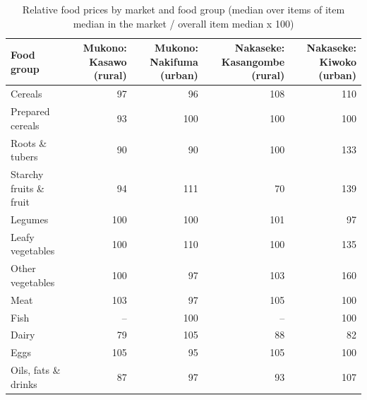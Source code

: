 \begin{table}[htbp]
\centering
\caption{Relative food prices by market and food group (median over items of item median in the market / overall item median x 100)}
\label{tab:market_food_group_price_index}
\begin{tabular}{lrrrr}
\toprule
Food group & Mukono: Kasawo (rural) & Mukono: Nakifuma (urban) & Nakaseke: Kasangombe (rural) & Nakaseke: Kiwoko (urban) \\
\midrule
Cereals & 97 & 96 & 108 & 110 \\
Prepared cereals & 93 & 100 & 100 & 100 \\
Roots \& tubers & 90 & 90 & 100 & 133 \\
Starchy fruits \& fruit & 94 & 111 & 70 & 139 \\
Legumes & 100 & 100 & 101 & 97 \\
Leafy vegetables & 100 & 110 & 100 & 135 \\
Other vegetables & 100 & 97 & 103 & 160 \\
Meat & 103 & 97 & 105 & 100 \\
Fish & -- & 100 & -- & 100 \\
Dairy & 79 & 105 & 88 & 82 \\
Eggs & 105 & 95 & 105 & 100 \\
Oils, fats \& drinks & 87 & 97 & 93 & 107 \\
\bottomrule
\end{tabular}
\end{table}
